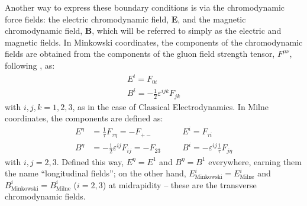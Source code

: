 Another way to express these boundary conditions is via the chromodynamic force fields: the electric chromodynamic field, $\mathbf{E}$, and the magnetic chromodynamic field, $\mathbf{B}$, which will be referred to simply as the electric and magnetic fields. In Minkowski coordinates, the components of the chromodynamic fields are obtained from the components of the gluon field strength tensor, $F^{\mu \nu}$, following \cite{Lappi:2017skr}, as:
\begin{subequations}
\begin{gather}
E^i = F_{0 i}\\
B^i = -\frac12 \varepsilon^{ijk} F_{jk}
\end{gather}
\end{subequations}
with $i,j,k=1,2,3$, as in the case of Classical Electrodynamics. In Milne coordinates, the components are defined as:
\begin{subequations}
\begin{alignat}{2}
E^\eta &= \frac{1}{\tau} F_{\tau \eta}  = - F_{+ -}
 && E^i = F_{\tau i} \label{eq:E_from_F} \\
 B^\eta &= -\frac12 \varepsilon^{ij} F_{ij} = -F_{23} \quad
&& B^i = -\varepsilon^{ij} \frac{1}{\tau} F_{j \eta} \label{eq:B_from_F}
\end{alignat}
\label{eq:E_B_from_F}
\end{subequations}
with $i,j=2,3$. Defined this way, $E^\eta= E^1$ and $B^\eta = B^1$ everywhere, earning them the name ``longitudinal fields''; on the other hand, $E^i_{\text{Minkowski}} = E^i_{\text{Milne}}$  and $B^i_{\text{Minkowski}} = B^i_{\text{Milne}}$ ($i=2,3$) at midrapidity -- these are the transverse chromodynamic fields.

